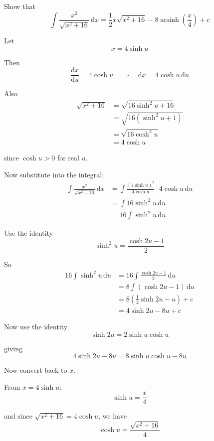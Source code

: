 \documentclass[leqno]{article}
\begin{document}
\begin{enumerate}[
  label=\textbf{\arabic*.},
  leftmargin=*,
  topsep=0pt,
  partopsep=0pt,
  parsep=0pt
]
\newpage

\questionitem

Show that
\[
\int \frac{x^2}{\sqrt{x^2 + 16}}\,\mathrm{d}x = \frac{1}{2}x\sqrt{x^2 + 16} - 8\operatorname{arsinh}\left(\frac{x}{4}\right) + c
\]

\vspace*{10pt}

\begin{djsSolution}
Let
\[
x=4\sinh u
\]

Then
\[
\frac{\mathrm{d}x}{\mathrm{d}u}=4\cosh u
\quad\Longrightarrow\quad
\mathrm{d}x=4\cosh u\,\mathrm{d}u
\]

Also
\begin{align*}
\sqrt{x^2+16}
&=\sqrt{16\sinh^2u+16} \\
&=\sqrt{16(\sinh^2u+1)} \\
&=\sqrt{16\cosh^2u} \\
&=4\cosh u
\end{align*}

since $\cosh u>0$ for real $u$.

Now substitute into the integral:
\begin{align*}
\int \frac{x^2}{\sqrt{x^2+16}}\,\mathrm{d}x
&=\int \frac{(4\sinh u)^2}{4\cosh u}\cdot 4\cosh u\,\mathrm{d}u \\
&=\int 16\sinh^2u\,\mathrm{d}u \\
&=16\int \sinh^2u\,\mathrm{d}u
\end{align*}

Use the identity
\[
\sinh^2u=\frac{\cosh 2u-1}{2}
\]

So
\begin{align*}
16\int \sinh^2u\,\mathrm{d}u
&=16\int \frac{\cosh 2u-1}{2}\,\mathrm{d}u \\
&=8\int (\cosh 2u-1)\,\mathrm{d}u \\
&=8\left(\frac{1}{2}\sinh 2u-u\right)+c \\
&=4\sinh 2u-8u+c
\end{align*}

Now use the identity
\[
\sinh 2u=2\sinh u\cosh u
\]

giving
\[
4\sinh 2u-8u=8\sinh u\cosh u-8u
\]

Now convert back to $x$.

From $x=4\sinh u$:
\[
\sinh u=\frac{x}{4}
\]

and since $\sqrt{x^2+16}=4\cosh u$, we have
\[
\cosh u=\frac{\sqrt{x^2+16}}{4}
\]


\end{djsSolution}
\end{enumerate}
\end{document}
